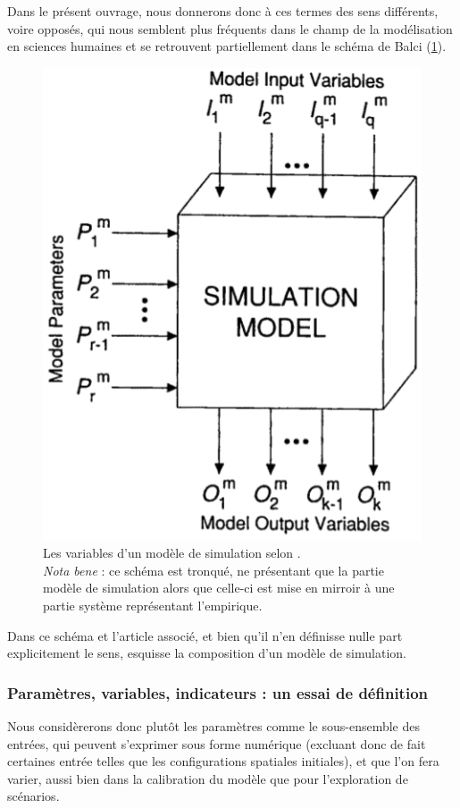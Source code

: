 Dans le présent ouvrage, nous donnerons donc à ces termes des sens différents, voire opposés, qui nous semblent plus fréquents dans le champ de la modélisation en sciences humaines et se retrouvent partiellement dans le schéma de Balci (\cref{fig:parametres-Balci}).
\begin{figure}[!h]
	\includegraphics[width=.4\linewidth]{img/Balci1994a_Figure_Parametres.png}
	\caption[Les variables d'un modèle de simulation selon \citeauthor{balci_validation_1994}]{Les variables d'un modèle de simulation selon \textcite[122]{balci_validation_1994}.\\
		\textit{Nota bene} : ce schéma est tronqué, ne présentant que la partie \og modèle de simulation\fg{} alors que celle-ci est mise en mirroir à une partie \og système\fg{} représentant l'empirique.}
	\label{fig:parametres-Balci} 
\end{figure}

Dans ce schéma et l'article associé, et bien qu'il n'en définisse nulle part explicitement le sens, \citeauthor{balci_validation_1994} esquisse la composition d'un modèle de simulation.



\subsubsection{Paramètres, variables, indicateurs : un essai de définition}
\label{subsubsec:mes_definitions_params}

Nous considèrerons donc plutôt les paramètres comme le sous-ensemble des entrées, qui peuvent s'exprimer sous forme numérique (excluant donc de fait certaines entrée telles que les configurations spatiales initiales), et que l'on fera varier, aussi bien dans la calibration du modèle que pour l'exploration de scénarios.


